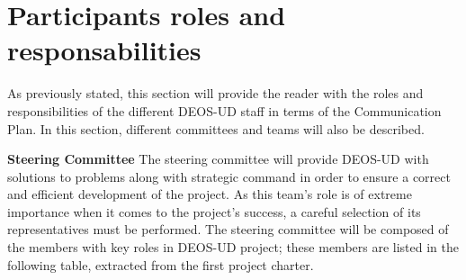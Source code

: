 \section{Participants roles and responsabilities}
As previously stated, this section will provide the reader with the roles and responsibilities of the different DEOS-UD staff in terms of the Communication Plan. In this section, different committees and teams will also be described. 

\textbf{Steering Committee}
\newline
\newline
The steering committee will provide DEOS-UD with solutions to problems along with strategic command in order to ensure a correct and efficient development of the project. As this team’s role is of extreme importance when it comes to the project’s success, a careful selection of its representatives must be performed. The steering committee will be composed of the members with key roles in DEOS-UD project; these members are listed in the following table, extracted from the first project charter. 

